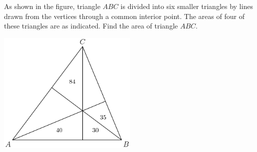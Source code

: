 As shown in the figure, triangle $ABC$ is divided into six smaller triangles by lines drawn from the vertices through a common interior point.  The areas of four of these triangles are as indicated.  Find the area of triangle $ABC$.

\begin{center}
\includegraphics[width = 67.0mm]{img/fig0.png}
\end{center}